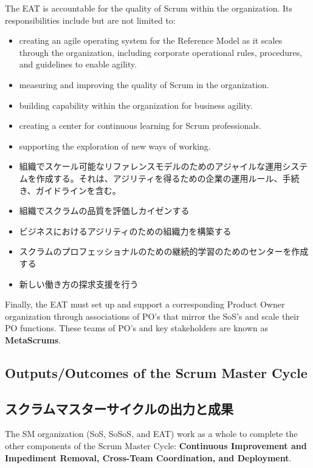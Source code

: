 \documentclass[12pt,a4paper,parskip=full]{scrartcl}
\begin{document}
The EAT is accountable for the quality of Scrum within the organization.
Its responsibilities include but are not limited to:
\begin{itemize}
\item creating an agile operating system for the Reference Model as it
scales through the organization, including corporate operational rules,
procedures, and guidelines to enable agility.
\item measuring and improving the quality of Scrum in the organization.
\item building capability within the organization for business agility.
\item creating a center for continuous learning for Scrum professionals.
\item supporting the exploration of new ways of working.
\end{itemize}
\fi
\begin{itemize}
\item 組織でスケール可能なリファレンスモデルのためのアジャイルな運用システムを作成する。それは、アジリティを得るための企業の運用ルール、手続き、ガイドラインを含む。
\item 組織でスクラムの品質を評価しカイゼンする
\item ビジネスにおけるアジリティのための組織力を構築する
\item スクラムのプロフェッショナルのための継続的学習のためのセンターを作成する
\item 新しい働き方の探求支援を行う
\end{itemize}
Finally, the EAT must set up and support a corresponding Product Owner
organization through associations of PO's that mirror the SoS's and scale
their PO functions. These teams of PO's and key stakeholders are known as
\textbf{MetaScrums}.

\subsection{Outputs/Outcomes of the Scrum Master Cycle}
\fi
\subsection{スクラムマスターサイクルの出力と成果}
The SM organization (SoS, SoSoS, and EAT) work as a whole to complete the
other components of the Scrum Master Cycle: \textbf{Continuous Improvement
and Impediment Removal, Cross-Team Coordination, and Deployment}.
\end{document}
